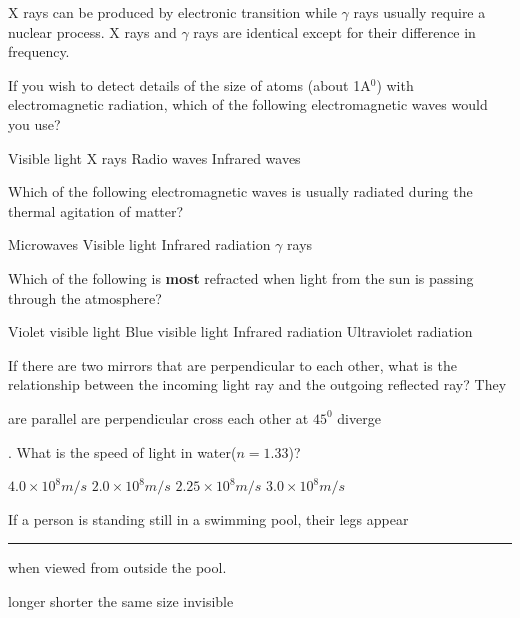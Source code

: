 \documentclass[12pt,addpoints]{exam}
\begin{document}
{{{\begin{questions}
\begin{choices}
						\choice X rays can be produced by electronic transition while $\gamma$ rays usually require a nuclear process.
						\choice X rays and $\gamma$ rays are identical except for their difference in frequency.
					\end{choices}
					\question If you wish to detect details of the size of atoms (about 1A$^0$) with electromagnetic radiation, which of the following electromagnetic waves would you use? \\
					\begin{oneparchoices}
						\choice Visible light
						\choice X rays
						\choice Radio waves
						\choice Infrared waves
					\end{oneparchoices}
					\question Which of the following electromagnetic waves is usually radiated during the thermal agitation of matter?\\
					\begin{oneparchoices}
						\choice Microwaves
						\choice Visible light
						\choice Infrared radiation
						\choice $\gamma$ rays
					\end{oneparchoices}
					\question Which of the following is \textbf{most} refracted when light from the sun is passing through the atmosphere? \\
					\begin{oneparchoices}
						\choice Violet visible light
						\choice Blue visible light
						\choice Infrared radiation
						\choice Ultraviolet radiation
					\end{oneparchoices}
					\question If there are two mirrors that are perpendicular to each other, what is the relationship between the incoming light ray and the outgoing reflected ray? They \\
					\begin{oneparchoices}
						\choice are parallel
						\choice are perpendicular
						\choice cross each other at $45^0$
						\choice diverge
					\end{oneparchoices}.
					\question What is the speed of light in water($n=1.33$)?\\
					\begin{oneparchoices}
						\choice $4.0\times10^{8}m/s$
						\choice $2.0\times10^{8}m/s$
						\choice $2.25\times10^{8}m/s$
						\choice $3.0\times10^{8}m/s$
					\end{oneparchoices}
					\question If a person is standing still in a swimming pool, their legs appear \noindent\rule{1.5cm}{0.4pt} when viewed from outside the pool.\\
					\begin{oneparchoices}
						\choice longer
						\choice shorter
						\choice the same size
						\choice invisible
					\end{oneparchoices}
					

\end{questions}}}}
\end{document}
